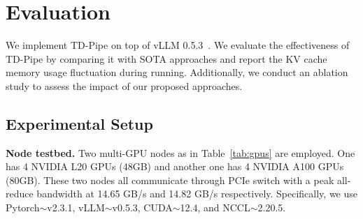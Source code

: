 \section{Evaluation}
\label{sec:evaluation}

We implement TD-Pipe on top of vLLM 0.5.3~\cite{vllm2024}.
We evaluate the effectiveness of TD-Pipe by comparing it with SOTA approaches and report the KV cache memory usage fluctuation during running.
Additionally, we conduct an ablation study to assess the impact of our proposed approaches.

\subsection{Experimental Setup}
\label{Setup}
\begin{table}[!t]
\caption{GPU Configurations}
\label{tab:gpus}
\centering
{}
\end{table}

\noindent\textbf{Node testbed.} 
Two multi-GPU nodes as in Table~\ref{tab:gpus} are employed.
One has 4 NVIDIA L20 GPUs (48GB) and another one has 4 NVIDIA A100 GPUs (80GB).
These two nodes all communicate through PCIe switch with a peak all-reduce bandwidth at 14.65 GB/s and 14.82 GB/s respectively.
Specifically, we use Pytorch$\sim$v2.3.1, vLLM$\sim$v0.5.3, CUDA$\sim$12.4, and NCCL$\sim$2.20.5.

